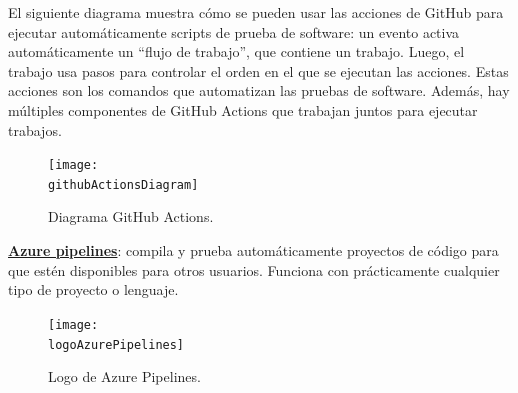\begin{compactitem}
    El siguiente diagrama muestra cómo se pueden usar las acciones de GitHub para ejecutar automáticamente scripts de prueba de software: un evento activa automáticamente un “flujo de trabajo”, que contiene un trabajo. Luego, el trabajo usa pasos para controlar el orden en el que se ejecutan las acciones. Estas acciones son los comandos que automatizan las pruebas de software. Además, hay múltiples componentes de GitHub Actions que trabajan juntos para ejecutar trabajos.
    \begin{figure}[h]
        \centering
        \texttt{[image: \\githubActionsDiagram]}
        \caption{Diagrama GitHub Actions.}
    \end{figure}
    \item \textbf{\underline{Azure pipelines}}: compila y prueba automáticamente proyectos de código para que estén disponibles para otros usuarios. Funciona con prácticamente cualquier tipo de proyecto o lenguaje.
    
    \begin{figure}[h]
        \centering
        \texttt{[image: \\logoAzurePipelines]}
        \caption{Logo de Azure Pipelines.}
    \end{figure}
    

\end{compactitem}
